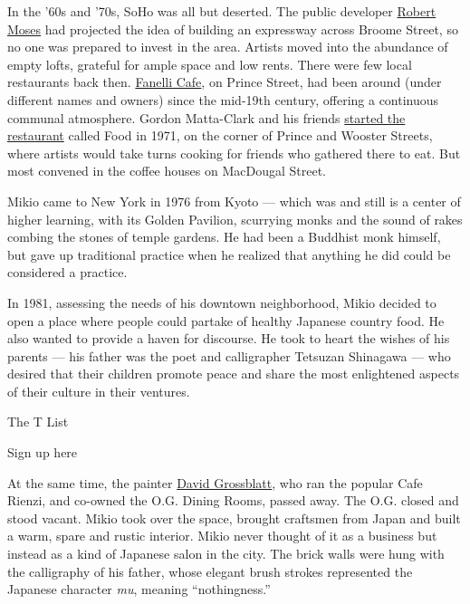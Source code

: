 In the '60s and '70s, SoHo was all but deserted. The public developer
\href{https://www.nytimes.com/topic/person/robert-moses}{Robert Moses}
had projected the idea of building an expressway across Broome Street,
so no one was prepared to invest in the area. Artists moved into the
abundance of empty lofts, grateful for ample space and low rents. There
were few local restaurants back then.
\href{https://www.nytimes.com/2019/10/14/t-magazine/fanelli-cafe.html}{Fanelli
Cafe}, on Prince Street, had been around (under different names and
owners) since the mid-19th century, offering a continuous communal
atmosphere. Gordon Matta-Clark and his friends
\href{https://tmagazine.blogs.nytimes.com/2013/05/10/food-matters-when-eating-and-art-became-one/}{started
the restaurant} called Food in 1971, on the corner of Prince and Wooster
Streets, where artists would take turns cooking for friends who gathered
there to eat. But most convened in the coffee houses on MacDougal
Street.

Mikio came to New York in 1976 from Kyoto --- which was and still is a
center of higher learning, with its Golden Pavilion, scurrying monks and
the sound of rakes combing the stones of temple gardens. He had been a
Buddhist monk himself, but gave up traditional practice when he realized
that anything he did could be considered a practice.

In 1981, assessing the needs of his downtown neighborhood, Mikio decided
to open a place where people could partake of healthy Japanese country
food. He also wanted to provide a haven for discourse. He took to heart
the wishes of his parents --- his father was the poet and calligrapher
Tetsuzan Shinagawa --- who desired that their children promote peace and
share the most enlightened aspects of their culture in their ventures.

The T List \textbar{}

Sign up here

At the same time, the painter
\href{https://www.nytimes.com/1981/06/26/obituaries/david-grossblatt-61-a-painter-and-operator-of-the-cafe-rienzi.html}{David
Grossblatt}, who ran the popular Cafe Rienzi, and co-owned the O.G.
Dining Rooms, passed away. The O.G. closed and stood vacant. Mikio took
over the space, brought craftsmen from Japan and built a warm, spare and
rustic interior. Mikio never thought of it as a business but instead as
a kind of Japanese salon in the city. The brick walls were hung with the
calligraphy of his father, whose elegant brush strokes represented the
Japanese character \emph{mu}, meaning ``nothingness.''

